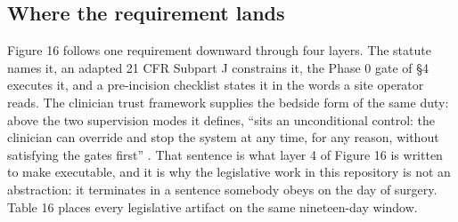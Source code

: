 \subsection{Where the requirement lands}

Figure 16 follows one requirement downward through four layers. The statute
names it, an adapted 21 CFR Subpart J constrains it, the Phase 0 gate of \S4
executes it, and a pre-incision checklist states it in the words a site operator
reads. The clinician trust framework supplies the bedside form of the same duty:
above the two supervision modes it defines, ``sits an unconditional control: the
clinician can override and stop the system at any time, for any reason, without
satisfying the gates first'' \cite{clintrust}. That sentence is what layer 4 of
Figure 16 is written to make executable, and it is why the legislative work in
this repository is not an abstraction: it terminates in a sentence somebody obeys
on the day of surgery. Table 16 places every legislative artifact on the same
nineteen-day window.

